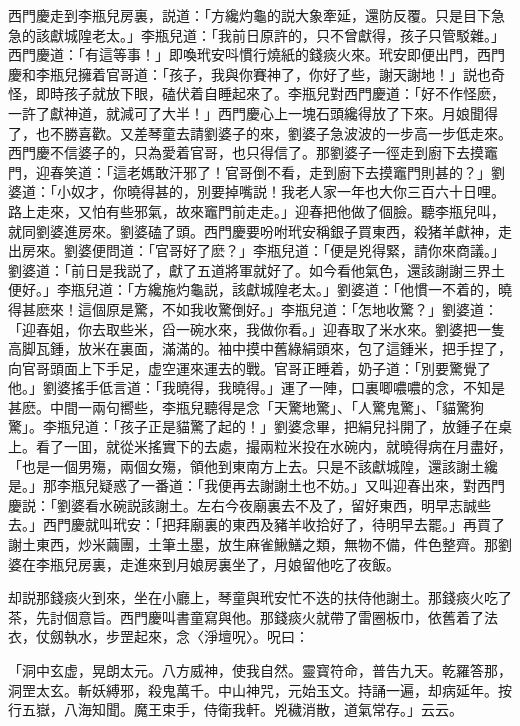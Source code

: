 西門慶走到李瓶兒房裏，説道：「方纔灼龜的説大象牽延，還防反覆。只是目下急急的該獻城隍老太。」李瓶兒道：「我前日原許的，只不曾獻得，孩子只管駁雜。」西門慶道：「有這等事！」即喚玳安呌慣行燒紙的錢痰火來。玳安即便出門，西門慶和李瓶兒擁着官哥道：「孩子，我與你賽神了，你好了些，謝天謝地！」説也奇怪，即時孩子就放下眼，磕伏着自睡起來了。李瓶兒對西門慶道：「好不作怪麽，一許了獻神道，就減可了大半！」西門慶心上一塊石頭纔得放了下來。月娘聞得了，也不勝喜歡。又差琴童去請劉婆子的來，劉婆子急波波的一步高一步低走來。西門慶不信婆子的，只為愛着官哥，也只得信了。那劉婆子一徑走到廚下去摸竈門，迎春笑道：「這老媽敢汗邪了！官哥倒不看，走到廚下去摸竈門則甚的？」劉婆道：「小奴才，你曉得甚的，別要掉嘴説！我老人家一年也大你三百六十日哩。路上走來，又怕有些邪氣，故來竈門前走走。」迎春把他做了個臉。聽李瓶兒叫，就同劉婆進房來。劉婆磕了頭。西門慶要吩咐玳安稱銀子買東西，殺猪羊獻神，走出房來。劉婆便問道：「官哥好了麽？」李瓶兒道：「便是兇得緊，請你來商議。」劉婆道：「前日是我説了，獻了五道將軍就好了。如今看他氣色，還該謝謝三界土便好。」李瓶兒道：「方纔施灼龜説，該獻城隍老太。」劉婆道：「他慣一不着的，曉得甚麽來！這個原是驚，不如我收驚倒好。」李瓶兒道：「怎地收驚？」劉婆道：「迎春姐，你去取些米，舀一碗水來，我做你看。」迎春取了米水來。劉婆把一隻高脚瓦鍾，放米在裏面，滿滿的。袖中摸中舊綠絹頭來，包了這鍾米，把手捏了，向官哥頭面上下手足，虚空運來運去的戰。官哥正睡着，奶子道：「別要驚覺了他。」劉婆搖手低言道：「我曉得，我曉得。」運了一陣，口裏唧噥噥的念，不知是甚麽。中間一兩句嚮些，李瓶兒聽得是念「天驚地驚」、「人驚鬼驚」、「貓驚狗驚」。李瓶兒道：「孩子正是貓驚了起的！」劉婆念畢，把絹兒抖開了，放鍾子在桌上。看了一囬，就從米搖實下的去處，撮兩粒米投在水碗内，就曉得病在月盡好，「也是一個男殤，兩個女殤，領他到東南方上去。只是不該獻城隍，還該謝土纔是。」那李瓶兒疑惑了一番道：「我便再去謝謝土也不妨。」又叫迎春出來，對西門慶説：「劉婆看水碗説該謝土。左右今夜廟裏去不及了，留好東西，明早志誠些去。」西門慶就叫玳安：「把拜廟裏的東西及豬羊收拾好了，待明早去罷。」再買了謝土東西，炒米繭團，土筆土墨，放生麻雀鰍鱔之類，無物不備，件色整齊。那劉婆在李瓶兒房裏，走進來到月娘房裏坐了，月娘留他吃了夜飯。

却説那錢痰火到來，坐在小廳上，琴童與玳安忙不迭的扶侍他謝土。那錢痰火吃了茶，先討個意旨。西門慶叫書童寫與他。那錢痰火就帶了雷圈板巾，依舊着了法衣，仗劔執水，步罡起來，念〈淨壇呪〉。呪曰：

\begin{myquote}
「洞中玄虚，晃朗太元。八方威神，使我自然。靈寳符命，普告九天。乾羅答那，洞罡太玄。斬妖縛邪，殺鬼萬千。中山神咒，元始玉文。持誦一遍，却病延年。按行五嶽，八海知聞。魔王束手，侍衛我軒。兇穢消散，道氣常存。」云云。
\end{myquote}

